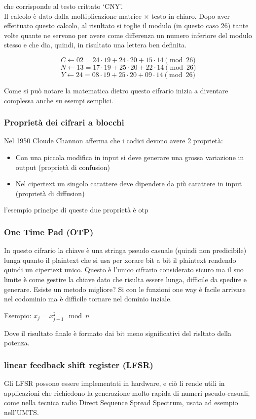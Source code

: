 \documentclass[10pt,a4paper]{article}
\begin{document}
che corrisponde al testo crittato ‘CNY’.\\
Il calcolo è dato dalla moltiplicazione matrice $\times$ testo in chiaro. Dopo aver effettuato questo calcolo, al risultato si toglie il modulo (in questo caso 26) tante volte quante ne servono per avere come differenza un numero inferiore del modulo stesso e che dia, quindi, in risultato una lettera ben definita.

    $$C \leftarrow 02 = 24 \cdot 19 + 24 \cdot 20 + 15 \cdot 14 \pmod{26}$$
    $$N \leftarrow 13 = 17 \cdot 19 + 25 \cdot 20 + 22 \cdot 14 \pmod{26}$$
    $$Y \leftarrow 24 = 08 \cdot 19 + 25 \cdot 20 + 09 \cdot 14 \pmod{26}$$
    
Come si può notare la matematica dietro questo cifrario inizia a diventare complessa anche su esempi semplici.

\subsubsection{Proprietà dei cifrari a blocchi}
Nel 1950 Cloude Channon afferma che i codici devono avere 2 proprietà:
\begin{itemize}
\item Con una piccola modifica in input si deve generare una grossa variazione in output (proprietà di confusion)
\item Nel cipertext un singolo carattere deve dipendere da più carattere in input (proprietà di diffusion)
\end{itemize}
l'esempio principe di queste due proprietà è otp
\subsubsection{One Time Pad (OTP)}
In questo cifrario la chiave è una stringa pseudo casuale (quindi non predicibile) lunga quanto il plaintext che si usa per xorare bit a bit il plaintext rendendo quindi un cipertext unico. Questo è l'unico cifrario considerato sicuro ma il suo limite è come gestire la chiave dato che risulta essere lunga, difficile da spedire e generare. Esiste un metodo migliore? Si con le funzioni one way è facile arrivare nel codominio ma è difficile tornare nel dominio inziale.

Esempio:
$x_j=x^2_{j-1}\mod n$

Dove il risultato finale è formato dai bit meno significativi del risltato della potenza.
\subsubsection{linear feedback shift register (LFSR)} 
Gli LFSR possono essere implementati in hardware, e ciò li rende utili in applicazioni che richiedono la generazione molto rapida di numeri pseudo-casuali, come nella tecnica radio Direct Sequence Spread Spectrum, usata ad esempio nell'UMTS.
\end{document}
